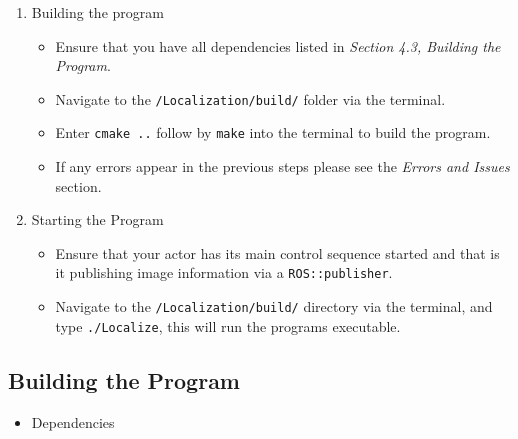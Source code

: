 \documentclass[a4paper,11pt]{article}
\begin{document}
  \begin{enumerate}
   \item Building the program
     \begin{itemize}
       \item Ensure that you have all dependencies listed in \emph{Section 4.3, Building the Program}.
       \item Navigate to the \texttt{/Localization/build/} folder via the terminal.
       \item Enter \texttt{cmake ..} follow by \texttt{make} into the terminal to build the program.
       \item If any errors appear in the previous steps please see the \emph{Errors and Issues} section.
     \end{itemize}
   \item Starting the Program
     \begin{itemize}
       \item Ensure that your actor has its main control sequence started and that is it publishing image information via a \texttt{ROS::publisher}.
       \item Navigate to the \texttt{/Localization/build/} directory via the terminal, and type \texttt{./Localize}, this will run the programs executable.
     \end{itemize}
  \end{enumerate}
  
  
  \subsection{Building the Program}
  \begin{itemize}
   \item Dependencies
  \end{itemize}



\end{document}
